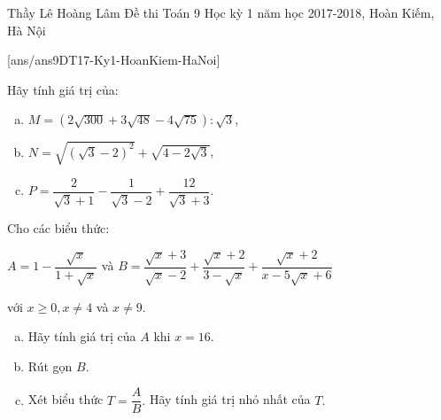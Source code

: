 \begin{name}
{Thầy Lê Hoàng Lâm}
{Đề thi Toán 9 Học kỳ 1 năm học 2017-2018, Hoàn Kiếm, Hà Nội }
\end{name}
\setcounter{ex}{0}
[ans/ans9DT17-Ky1-HoanKiem-HaNoi]

\begin{ex}%
	Hãy tính giá trị của:
\begin{enumerate}[a)]
	\item $M=(2\sqrt{300}+3\sqrt{48}-4\sqrt{75}):\sqrt{3}$,
	\item $N=\sqrt{(\sqrt{3}-2)^2}+\sqrt{4-2\sqrt{3}}$,
	\item $P=\dfrac{2	}{\sqrt{3}+1}-\dfrac{1}{\sqrt{3}-2}+\dfrac{12}{\sqrt{3}+3}$.
\end{enumerate}
\end{ex}

\begin{ex}%
	Cho các biểu thức: 
	\begin{center}
		$A=1-\dfrac{\sqrt{x}}{1+\sqrt{x}}$ và $B=\dfrac{\sqrt{x}+3}{\sqrt{x}-2}+\dfrac{\sqrt{x}+2}{3-\sqrt{x}}+\dfrac{\sqrt{x}+2}{x-5\sqrt{x}+6}$
	\end{center}
		với $x\ge 0, x\neq 4$ và $x\neq 9.$
\begin{enumerate}[a)]
	\item Hãy tính giá trị của $A$ khi $x=16.$
	\item Rút gọn $B.$
	\item Xét biểu thức $T=\dfrac{A}{B}.$ Hãy tính giá trị nhỏ nhất của $T.$ 
\end{enumerate}
\end{ex}

